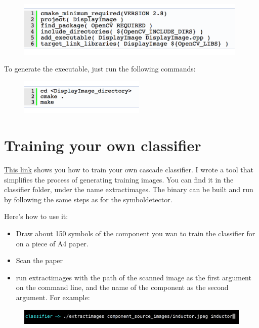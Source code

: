 \documentclass{article}
\begin{document}
\begin{figure}[h]				%
	\centering
	\includegraphics[width=11cm]{cmakepic}
\end{figure}

To generate the executable, just run the following commands:

\begin{figure}[h]				%
	\centering
	\includegraphics[width=6cm]{genexec}
\end{figure}

\section{Training your own classifier}
\href{https://docs.opencv.org/3.1.0/dc/d88/tutorial_traincascade.html}{\color{blue}This link} shows you how to train your own cascade classifier. I wrote a tool that simplifies the process of generating training images. You can find it in the classifier folder, under the name extractimages. The binary can be built and run by following the same steps as for the symboldetector.

Here's how to use it:
\begin{itemize}
\item Draw about 150 symbols of the component you wan to train the classifier for on a piece of A4 paper.
\item Scan the paper
\item run extractimages with the path of the scanned image as the first argument on the command line, and the name of the component as the second argument. For example:
\end{itemize}

\begin{figure}[h]				%
	\centering
	\includegraphics[width=12cm]{extimg}
\end{figure}
\end{document}
